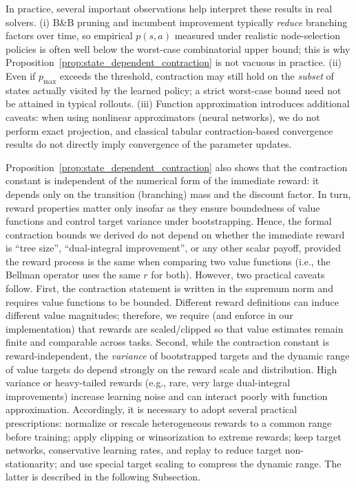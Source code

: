 \documentclass[preprint,12pt]{elsarticle} %
\theoremstyle{plain}
\theoremstyle{definition}
\theoremstyle{remark}
\begin{document}
In practice, several important observations help interpret these results in real solvers. (i) B\&B pruning and incumbent improvement typically \emph{reduce} branching factors over time, so empirical \(p(s,a)\) measured under realistic node-selection policies is often well below the worst-case combinatorial upper bound; this is why Proposition~\ref{prop:state_dependent_contraction} is not vacuous in practice. (ii) Even if \(p_{\max}\) exceeds the threshold, contraction may still hold on the \emph{subset} of states actually visited by the learned policy; a strict worst-case bound need not be attained in typical rollouts. (iii) Function approximation introduces additional caveats: when using nonlinear approximators (neural networks), we do not perform exact projection, and classical tabular contraction-based convergence results do not directly imply convergence of the parameter updates. %

Proposition~\ref{prop:state_dependent_contraction} also shows that the contraction constant is independent of the numerical form of the immediate reward: it depends only on the transition (branching) mass and the discount factor. In turn, reward properties matter only insofar as they ensure boundedness of value functions and control target variance under bootstrapping. Hence, the formal contraction bounds we derived do not depend on whether the immediate reward is ``tree size'', ``dual-integral improvement'', or any other scalar payoff, provided the reward process is the same when comparing two value functions (i.e., the Bellman operator uses the same $r$ for both). However, two practical caveats follow. First, the contraction statement is written in the supremum norm and requires value functions to be bounded. Different reward definitions can induce different value magnitudes; therefore, we require (and enforce in our implementation) that rewards are scaled/clipped so that value estimates remain finite and comparable across tasks. Second, while the contraction constant is reward-independent, the \emph{variance} of bootstrapped targets and the dynamic range of value targets do depend strongly on the reward scale and distribution. High variance or heavy-tailed rewards (e.g., rare, very large dual-integral improvements) increase learning noise and can interact poorly with function approximation. Accordingly, it is necessary to adopt several practical prescriptions: normalize or rescale heterogeneous rewards to a common range before training; apply clipping or winsorization to extreme rewards; keep target networks, conservative learning rates, and replay to reduce target non-stationarity; and use special target scaling to compress the dynamic range. The latter is described in the following Subsection.
\end{document}
